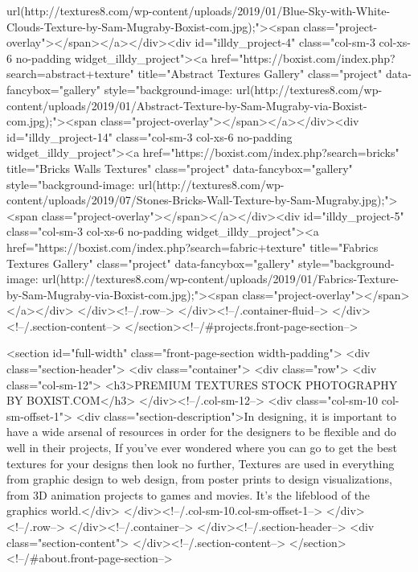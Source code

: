 url(http://textures8.com/wp-content/uploads/2019/01/Blue-Sky-with-White-Clouds-Texture-by-Sam-Mugraby-Boxist-com.jpg);"><span class="project-overlay"></span></a></div><div id="illdy_project-4" class="col-sm-3 col-xs-6 no-padding widget_illdy_project"><a href="https://boxist.com/index.php?search=abstract+texture" title="Abstract Textures Gallery" class="project" data-fancybox="gallery" style="background-image: url(http://textures8.com/wp-content/uploads/2019/01/Abstract-Texture-by-Sam-Mugraby-via-Boxist-com.jpg);"><span class="project-overlay"></span></a></div><div id="illdy_project-14" class="col-sm-3 col-xs-6 no-padding widget_illdy_project"><a href="https://boxist.com/index.php?search=bricks" title="Bricks Walls Textures" class="project" data-fancybox="gallery" style="background-image: url(http://textures8.com/wp-content/uploads/2019/07/Stones-Bricks-Wall-Texture-by-Sam-Mugraby.jpg);"><span class="project-overlay"></span></a></div><div id="illdy_project-5" class="col-sm-3 col-xs-6 no-padding widget_illdy_project"><a href="https://boxist.com/index.php?search=fabric+texture" title="Fabrics Textures Gallery" class="project" data-fancybox="gallery" style="background-image: url(http://textures8.com/wp-content/uploads/2019/01/Fabrics-Texture-by-Sam-Mugraby-via-Boxist-com.jpg);"><span class="project-overlay"></span></a></div>			</div><!--/.row-->
		</div><!--/.container-fluid-->
	</div><!--/.section-content-->
</section><!--/#projects.front-page-section-->



<section id="full-width" class="front-page-section width-padding">
			<div class="section-header">
			<div class="container">
				<div class="row">
											<div class="col-sm-12">
							<h3>PREMIUM TEXTURES STOCK PHOTOGRAPHY BY BOXIST.COM</h3>
						</div><!--/.col-sm-12-->
																<div class="col-sm-10 col-sm-offset-1">
							<div class="section-description">In designing, it is important to have a wide arsenal of resources in order for the designers to be flexible and do well in their projects, If you’ve ever wondered where you can go to get the best textures for your designs then look no further, Textures are used in everything from graphic design to web design, from poster prints to design visualizations, from 3D animation projects to games and movies. It’s the lifeblood of the graphics world.</div>
						</div><!--/.col-sm-10.col-sm-offset-1-->
									</div><!--/.row-->
			</div><!--/.container-->
		</div><!--/.section-header-->
		<div class="section-content">
			</div><!--/.section-content-->
</section><!--/#about.front-page-section-->

